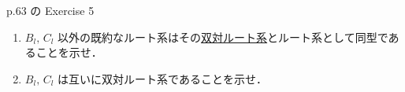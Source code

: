 \documentclass{ltjsarticle}
\theoremstyle{mystyle} %
\numberwithin{equation}{section}
\newcommand{\lto}{\longrightarrow}
\newcommand{\lmto}{\longmapsto}
\begin{document}
\begin{myproblem}[label=ex:3-11-5]{p.63 の Exercise 5}
    \begin{enumerate}
        \item 
        $B_l,\, C_l$ 以外の既約なルート系はその\hyperref[def:dual-root]{双対ルート系}とルート系として同型であることを示せ．
        \item 
        $B_l,\, C_l$ は互いに双対ルート系であることを示せ．
    \end{enumerate}
\end{myproblem}


\end{document}
